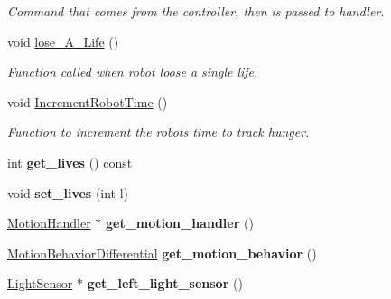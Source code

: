 \begin{DoxyCompactItemize}
\begin{DoxyCompactList}\small\item\em Command that comes from the controller, then is passed to handler. \end{DoxyCompactList}\item 
void \hyperlink{classRobot_ae0a3474ce96a7edee32f1b6597308d80}{lose\+\_\+\+A\+\_\+\+Life} ()\hypertarget{classRobot_ae0a3474ce96a7edee32f1b6597308d80}{}\label{classRobot_ae0a3474ce96a7edee32f1b6597308d80}

\begin{DoxyCompactList}\small\item\em Function called when robot loose a single life. \end{DoxyCompactList}\item 
void \hyperlink{classRobot_ad71cb8a7785ec61e938b62d1eb85c70e}{Increment\+Robot\+Time} ()\hypertarget{classRobot_ad71cb8a7785ec61e938b62d1eb85c70e}{}\label{classRobot_ad71cb8a7785ec61e938b62d1eb85c70e}

\begin{DoxyCompactList}\small\item\em Function to increment the robots time to track hunger. \end{DoxyCompactList}\item 
int {\bfseries get\+\_\+lives} () const \hypertarget{classRobot_a201302eeb10756e9f9a54de414efef08}{}\label{classRobot_a201302eeb10756e9f9a54de414efef08}

\item 
void {\bfseries set\+\_\+lives} (int l)\hypertarget{classRobot_a8823c73b258afe8cf8ef276e8f2f9aab}{}\label{classRobot_a8823c73b258afe8cf8ef276e8f2f9aab}

\item 
\hyperlink{classMotionHandler}{Motion\+Handler} $\ast$ {\bfseries get\+\_\+motion\+\_\+handler} ()\hypertarget{classRobot_a80b6c7f15493d4b5c608d185b9a116ce}{}\label{classRobot_a80b6c7f15493d4b5c608d185b9a116ce}

\item 
\hyperlink{classMotionBehaviorDifferential}{Motion\+Behavior\+Differential} {\bfseries get\+\_\+motion\+\_\+behavior} ()\hypertarget{classRobot_ab45bf3c6fdafcd14cdbdb2a8e3f558b8}{}\label{classRobot_ab45bf3c6fdafcd14cdbdb2a8e3f558b8}

\item 
\hyperlink{classLightSensor}{Light\+Sensor} $\ast$ {\bfseries get\+\_\+left\+\_\+light\+\_\+sensor} ()\hypertarget{classRobot_ac2e00bdd8bfac97d1bd89c86ee0fd727}{}\label{classRobot_ac2e00bdd8bfac97d1bd89c86ee0fd727}


\end{DoxyCompactItemize}
